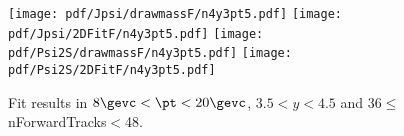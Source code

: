 \begin{figure}[H]
\begin{center}
\texttt{[image: pdf/Jpsi/drawmassF/n4y3pt5.pdf]}
\texttt{[image: pdf/Jpsi/2DFitF/n4y3pt5.pdf]}
\vspace*{-0.5cm}
\texttt{[image: pdf/Psi2S/drawmassF/n4y3pt5.pdf]}
\texttt{[image: pdf/Psi2S/2DFitF/n4y3pt5.pdf]}
\vspace*{-0.5cm}
\end{center}
\caption{Fit results in $8\gevc<\pt<20\gevc$, $3.5<y<4.5$ and 36$\leq$nForwardTracks$<$48.}
\label{Fitn4y3pt5}
\end{figure}
